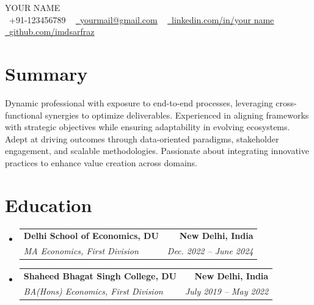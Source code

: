 \documentclass[letterpaper,11pt]{article}
\makeatletter
\newcommand{\resumeSubheading}[4]{
  \vspace{-2pt}\item
    \begin{tabular*}{1.0\textwidth}[t]{l@{\extracolsep{\fill}}r}
      \textbf{#1} & \textbf{\small #2} \\
      \textit{\small#3} & \textit{\small #4} \\
    \end{tabular*}\vspace{-7pt}
}
\newcommand{\resumeSubHeadingListStart}{\begin{itemize}[leftmargin=0.0in, label={}]}
\newcommand{\resumeSubHeadingListEnd}{\end{itemize}}
\makeatother
\begin{document}

\begin{center}
    {\Huge \scshape YOUR NAME} \\ \vspace{1pt}
    \small \raisebox{-0.1\height}\faPhone\ +91-123456789 ~ \href{mailto:your@gmail.com}{\raisebox{-0.2\height}\faEnvelope\  \underline{yourmail@gmail.com}} ~ 
    \href{https://www.linkedin.com/in/your name}{\raisebox{-0.2\height}\faLinkedin\ \underline{linkedin.com/in/your name}}  ~
    \href{https://github.com/imdsarfraz}{\raisebox{-0.2\height}\faGithub\ \underline{github.com/imdsarfraz}}
    \vspace{-8pt}
\end{center}


\section{Summary}
Dynamic professional with exposure to end-to-end processes, leveraging cross-functional synergies to optimize deliverables. Experienced in aligning frameworks with strategic objectives while ensuring adaptability in evolving ecosystems. Adept at driving outcomes through data-oriented paradigms, stakeholder engagement, and scalable methodologies. Passionate about integrating innovative practices to enhance value creation across domains.

\section{Education}
\resumeSubHeadingListStart
  \resumeSubheading{Delhi School of Economics, DU}{New Delhi, India}{MA Economics, First Division}{Dec. 2022 -- June 2024}
  \resumeSubheading{Shaheed Bhagat Singh College, DU}{New Delhi, India}{BA(Hons) Economics, First Division}{July 2019 -- May 2022}

\resumeSubHeadingListEnd

\end{document}
